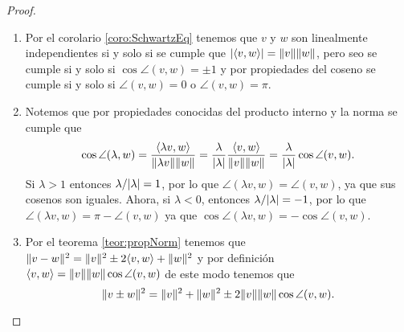 \begin{proof}~
  \begin{enumerate}
    \item Por el corolario \ref{coro:SchwartzEq} tenemos que $v$ y $w$ son linealmente independientes si y solo si se cumple que $\mathopen|\langle v,w\rangle\mathclose| = \mathopen\|v\mathclose\|\mathopen\|w\mathclose\|$, pero seo se cumple si y solo si $\cos\angle(v,w) = \pm 1$ y por propiedades del coseno se cumple si y solo si $\angle(v,w) = 0$  o $\angle(v,w) = \pi$.
    
    \item Notemos que por propiedades conocidas del producto interno y la norma se cumple que 
      \[
        \cos\angle(\lambda,w) = \frac{\langle\lambda v,w\rangle}{\mathopen\|\lambda v\mathclose\| \mathopen\|w\mathclose\|}
          = \frac{\lambda}{\mathopen|\lambda\mathclose|}  \frac{\langle v,w\rangle}{\mathopen\|v\mathclose\| \mathopen\|w\mathclose\|}
          = \frac{\lambda}{\mathopen|\lambda\mathclose|} \cos\angle(v,w).
      \]
      Si $\lambda > 1$ entonces $\lambda/\mathopen|\lambda\mathclose| = 1$, por lo que $\angle(\lambda v ,w) = \angle(v,w)$, ya que sus cosenos son iguales. Ahora, si $\lambda<0$, entonces $\lambda/\mathopen|\lambda\mathclose| = -1$, por lo que $\angle(\lambda v,w) = \pi - \angle(v,w)$ ya que $\cos\angle(\lambda v,w) = -\cos\angle(v,w)$.

      \item Por el teorema \ref{teor:propNorm} tenemos que $\mathopen\|v - w\mathclose\|^2 = \mathopen\|v\mathclose\|^2 \pm 2 \langle v,w\rangle + \mathopen\|w\mathclose\|^2$ y por definición $\langle v,w\rangle = \mathopen\|v\mathclose\|\mathopen\|w\mathclose\| \cos\angle(v,w)$ de este modo tenemos que 
        \[ \mathopen\|v \pm w\mathclose\|^2 = \mathopen\|v\mathclose\|^2  + \mathopen\|w\mathclose\|^2 \pm 2 \mathopen\|v\mathclose\|\mathopen\|w\mathclose\| \cos\angle(v,w). \qedhere \]
  \end{enumerate}
\end{proof}